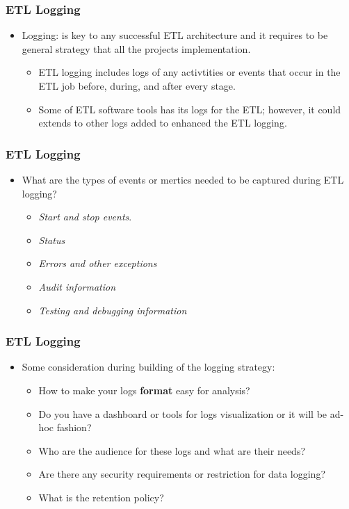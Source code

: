 \begin{frame}
	\frametitle{ETL Logging}
	\begin{itemize}[<+->]
		\item Logging: is key to any successful ETL architecture and it requires to be general strategy that all the projects implementation.

		\begin{itemize}[<+->]
			\item  ETL logging includes logs of any activtities or events that occur in the ETL job before, during, and after every stage.
			\item Some of ETL software tools has its logs for the ETL; however, it could extends to other logs added to enhanced the ETL logging.
		\end{itemize}
	\end{itemize}
\end{frame}


\begin{frame}
	\frametitle{ETL Logging}
	\begin{itemize}[<+->]

		\item What are the types of events or mertics needed to be captured during ETL logging?
		\begin{itemize}[<+->]

			\item \textit{Start and stop events}.
			\item \textit{Status}
			\item \textit{Errors and other exceptions}
			\item \textit{Audit information}
			\item \textit{Testing and debugging information}
		\end{itemize}
	\end{itemize}
\end{frame}


\begin{frame}
	\frametitle{ETL Logging}
	\begin{itemize}[<+->]

		\item Some consideration during building of the logging strategy:
		\begin{itemize}[<+->]
			\item How to make your logs \textbf{format} easy for analysis?
			\item Do you have a dashboard or tools for logs visualization or it will be ad-hoc fashion?
			\item Who are the audience for these logs and what are their needs?
			\item Are there any security requirements or restriction for data logging?
			\item What is the retention policy?
		\end{itemize}
	\end{itemize}
\end{frame}



